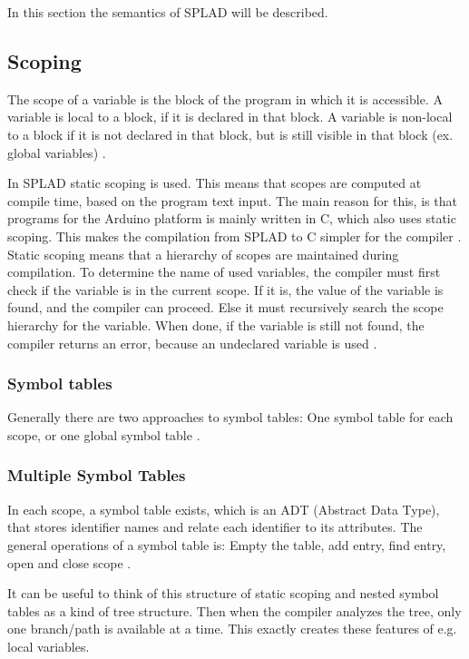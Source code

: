 In this section the semantics of SPLAD will be described. 

\subsection{Scoping}
The scope of a variable is the block of the program in which it is accessible. A variable is local to a block, if it is declared in that block. A variable is non-local to a block if it is not declared in that block, but is still visible in that block (ex. global variables) \citep{sebesta}.

In SPLAD static scoping is used. This means that scopes are computed at compile time, based on the program text input. The main reason for this, is that programs for the Arduino platform is mainly written in C, which also uses static scoping. This makes the compilation from SPLAD to C simpler for the compiler \citep{arduinobuild}. Static scoping means that a hierarchy of scopes are maintained during compilation. To determine the name of used variables, the compiler must first check if the variable is in the current scope. If it is, the value of the variable is found, and the compiler can proceed. Else it must recursively search the scope hierarchy for the variable. When done, if the variable is still not found, the compiler returns an error, because an undeclared variable is used \citep{sebesta}.
\subsubsection{Symbol tables}
Generally there are two approaches to symbol tables: One symbol table for each scope, or one global symbol table \citep{sebesta}. 
\subsubsection*{Multiple Symbol Tables}
In each scope, a symbol table exists, which is an ADT (Abstract Data Type), that stores identifier names and relate each identifier to its attributes. The general operations of a symbol table is: Empty the table, add entry, find entry, open and close scope \citep{sebesta}. 

It can be useful to think of this structure of static scoping and nested symbol tables as a kind of tree structure. Then when the compiler analyzes the tree, only one branch/path is available at a time. This exactly creates these features of e.g. local variables.

